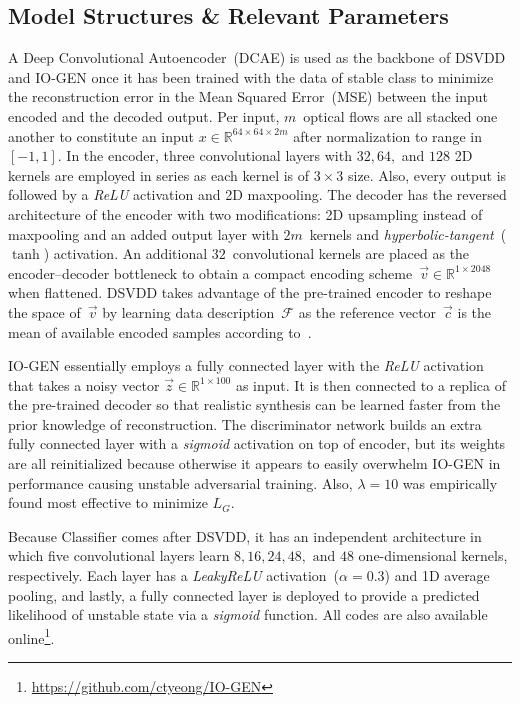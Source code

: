 \documentclass[letterpaper]{article} %
\begin{document}
\subsection{Model Structures \& Relevant Parameters}
\label{sec:model_structures}

A Deep Convolutional Autoencoder~(DCAE) is used as the backbone of DSVDD
and \mbox{IO-GEN} once it has been trained with the data of stable class to
minimize the reconstruction error in the Mean Squared Error~(MSE)
between the input encoded and the decoded output. Per input,
$m$~optical flows are all stacked one another to constitute an
input $x \in \mathbb{R}^{64 \times 64 \times 2m}$ after normalization to
range in $[-1, 1]$. In the encoder, three convolutional layers with $32,
64,$ and $128$ 2D kernels are employed in series as each kernel is of $3
\times 3$ size. Also, every output is followed by a \emph{ReLU}
activation and 2D maxpooling. The decoder has the reversed architecture
of the encoder with two modifications: 2D upsampling instead of
maxpooling and an added output layer with $2m$~kernels and
\emph{hyperbolic-tangent}~($\tanh$) activation.
An additional $32$~convolutional kernels are placed as the
encoder--decoder bottleneck to obtain a compact
encoding scheme~$\vec{v} \in \mathbb{R}^{1 \times 2048}$ when flattened.
DSVDD takes advantage of the pre-trained encoder to reshape the space
of~$\vec{v}$ by learning data description~$\mathcal{F}$ as the reference
vector~$\vec{c}$ is the mean of available encoded
samples according to~\citet{RVGDSBMK18}.

\mbox{IO-GEN} essentially employs a fully connected layer with the \emph{ReLU}
activation that takes a noisy vector $\vec{z} \in \mathbb{R}^{1 \times
100}$ as input. It is then connected to a replica of the pre-trained decoder
so that realistic synthesis can be learned faster from the prior
knowledge of reconstruction. The discriminator network builds an extra
fully connected layer with a \emph{sigmoid} activation on top of
encoder, but its weights are all reinitialized because otherwise it
appears to easily overwhelm \mbox{IO-GEN} in performance causing unstable
adversarial training. Also, $\lambda=10$ was empirically found most
effective to minimize $\mathit{L_G}$.

Because Classifier comes after DSVDD, it has an independent architecture
in which five convolutional layers learn $8, 16, 24, 48, \text{ and }
48$ one-dimensional kernels, respectively. Each layer has a
\emph{LeakyReLU} activation~($\alpha=0.3$) and 1D average pooling, and
lastly, a fully connected layer is deployed to provide a predicted
likelihood of unstable state via a \emph{sigmoid} function.
All codes are also available
online\footnote{\url{https://github.com/ctyeong/IO-GEN}}.
\end{document}
